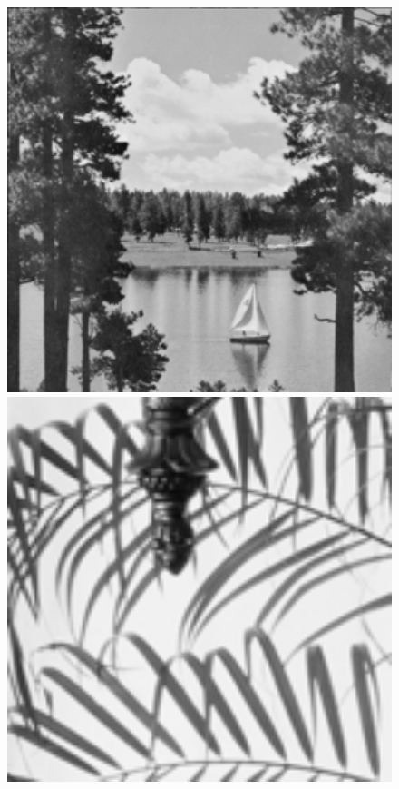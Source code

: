 \documentclass[runningheads]{llncs}
\begin{document}
\begin{figure}[t]
{\begin{minipage}{0.09\textwidth}
\end{minipage}
\begin{minipage}{0.09\textwidth}
\includegraphics[width=1.06\textwidth]{lake.png}
\end{minipage}
\begin{minipage}{0.09\textwidth}
\includegraphics[width=1.06\textwidth]{leaves.png}

\end{minipage}}
\end{figure}
\end{document}
